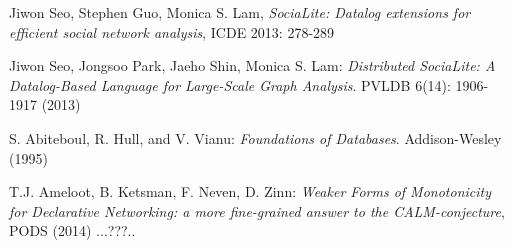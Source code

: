 \documentclass{pracamgr}
\theoremstyle{plain}
\theoremstyle{definition}
\theoremstyle{remark}
\begin{document}
\begin{thebibliography}{99}


 Jiwon Seo, Stephen Guo, Monica S. Lam, \textit{SociaLite: Datalog extensions for efficient social network analysis}, ICDE 2013: 278-289

 Jiwon Seo, Jongsoo Park, Jaeho Shin, Monica S. Lam: \textit{Distributed SociaLite: A Datalog-Based Language for Large-Scale Graph Analysis}. PVLDB 6(14): 1906-1917 (2013)

 S. Abiteboul, R. Hull, and V. Vianu: \textit{Foundations of Databases}. Addison-Wesley (1995)

 T.J. Ameloot, B. Ketsman, F. Neven, D. Zinn: \textit{Weaker Forms of Monotonicity for Declarative Networking: a more fine-grained answer to the CALM-conjecture}, PODS (2014) ...???..


\begin{comment}
\bibitem[Fif00]{ffgg} Filigran Fifak, Gizbert Gryzogrzechotalski,
  \textit{O blabalii fetorycznej}, Materiały Konferencji Euroblabal
  2000.

\bibitem[Fif01]{ff-sr} Filigran Fifak, \textit{O fetorach
    $\sigma$-$\rho$}, Acta Fetorica, 2001.

\bibitem[Głomb04]{grglo} Gryzybór Głombaski, \textit{Parazytonikacja
    blabiczna fetorów --- nowa teoria wszystkiego}, Warszawa 1904.

\bibitem[Hopp96]{hopp} Claude Hopper, \textit{On some $\Pi$-hedral
    surfaces in quasi-quasi space}, Omnius University Press, 1996.

\bibitem[Leuk00]{leuk} Lechoslav Leukocyt, \textit{Oval mappings ab ovo},
  Materiały Białostockiej Konferencji Hodowców Drobiu, 2000.

\bibitem[Rozk93]{JR} Josip A.~Rozkosza, \textit{O pewnych własnościach
    pewnych funkcji}, Północnopomorski Dziennik Matematyczny 63491
  (1993).

\bibitem[Spy59]{spyrpt} Mrowclaw Spyrpt, \textit{A matrix is a matrix
    is a matrix}, Mat. Zburp., 91 (1959) 28--35.

\bibitem[Sri64]{srinis} Rajagopalachari Sriniswamiramanathan,
  \textit{Some expansions on the Flausgloten Theorem on locally
    congested lutches}, J. Math.  Soc., North Bombay, 13 (1964) 72--6.

\bibitem[Whi25]{russell} Alfred N. Whitehead, Bertrand Russell,
  \textit{Principia Mathematica}, Cambridge University Press, 1925.

\bibitem[Zen69]{heu} Zenon Zenon, \textit{Użyteczne heurystyki
    w~blabalizie}, Młody Technik, nr~11, 1969.

\end{comment}

\end{thebibliography}
\end{document}
